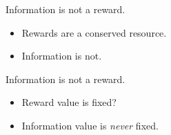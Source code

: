 \documentclass[10pt]{beamer}
\begin{document}
\begin{frame}[fragile]{Information is not a reward.}
\begin{itemize}
    \item Rewards are a conserved resource.
    \item Information is not.
\end{itemize}
\end{frame}

\begin{frame}[fragile]{Information is not a reward.}
\begin{itemize}
    \item Reward value is fixed?
    \item Information value is \textit{never} fixed.
\end{itemize}
\end{frame}


%   
%   

\end{document}
